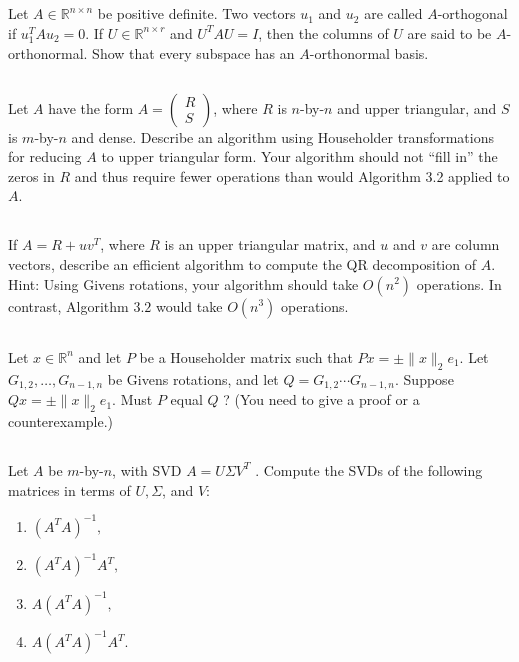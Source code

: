 \documentclass[a4paper]{ctexart}
\newcommand{\pf}{\textbf{\color{pink}{proof:}}}
\begin{document}
\subsection{}
Let $A \in \mathbb{R}^{n \times n}$ 
be positive definite. Two vectors $u_1$ and $u_2$ are called $A$-orthogonal 
if $u_1^T A u_2=0$. If $U \in \mathbb{R}^{n \times r}$ and $U^T A U=I$, 
then the columns of $U$ are said to be $A$-orthonormal. 
Show that every subspace has an $A$-orthonormal basis.

\pf

\subsection{}
Let $A$ have the form
$A =\begin{pmatrix}
    R\\S
\end{pmatrix}$,
where $R$ is $n$-by-$n$ and upper triangular, and $S$ is $m$-by-$n$ and dense. Describe
an algorithm using Householder transformations for reducing $A$ to upper triangular form. 
Your algorithm should not “fill in” the zeros in $R$ and thus require
fewer operations than would Algorithm 3.2 applied to $A$.

\pf

\subsection{}
If $A=R+u v^T$, where $R$ is an upper triangular 
matrix, and $u$ and $v$ are column vectors, describe an efficient algorithm to 
compute the QR decomposition of $A$. Hint: Using Givens rotations, your 
algorithm should take $O\left(n^2\right)$ operations. 
In contrast, Algorithm $3.2$ would take $O\left(n^3\right)$ operations.

\pf

\subsection{}
Let $x \in \mathbb{R}^n$ and let $P$ be a Householder matrix such 
that $P x=\pm\|x\|_2e_1$. Let $G_{1,2}, \ldots, G_{n-1, n}$ be Givens rotations, 
and let $Q=G_{1,2} \cdots G_{n-1, n}$. Suppose $Q x=\pm\|x\|_2e_1$. 
Must $P$ equal $Q$ ? (You need to give a proof or a counterexample.)

\pf

\subsection{}
Let $A$ be $m$-by-$n$, with SVD $A = U\Sigma V^T$ .
Compute the SVDs of the following matrices in terms of $U, \Sigma$, and $V$:
\begin{enumerate}
    \item $(A^TA)^{-1},$
    \item $(A^TA)^{-1}A^T,$
    \item $A(A^TA)^{-1},$
    \item $A(A^TA)^{-1}A^T.$
\end{enumerate}
\end{document}
